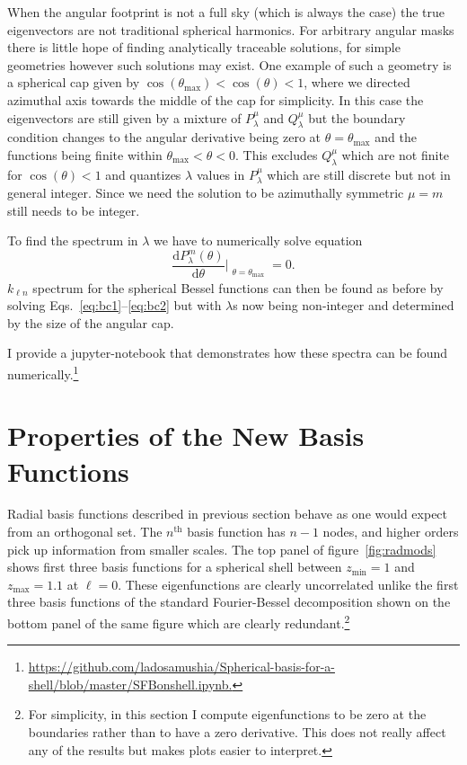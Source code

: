 \documentclass[fleqn,usenatbib]{mnras}
\begin{document}
When the angular footprint is not a full sky (which is always the case) the
true eigenvectors are not traditional spherical harmonics. For arbitrary
angular masks there is little hope of finding analytically traceable solutions,
for simple geometries however such solutions may exist. One example of such a
geometry is a spherical cap given by $\cos(\theta_\mathrm{max}) < \cos(\theta) <
1$, where we directed azimuthal axis towards the middle of the cap for
simplicity. In this case the eigenvectors are still given by a mixture of
$P^\mu_\lambda$ and $Q^\mu_\lambda$ but the boundary condition changes to the
angular derivative being zero at $\theta = \theta_\mathrm{max}$ and the
functions being finite within $\theta_\mathrm{max} < \theta < 0$. This excludes
$Q^\mu_\lambda$ which are not finite for $\cos(\theta) < 1$ and quantizes
$\lambda$ values in $P^\mu_\lambda$ which are still discrete but not in general
integer. Since we need the solution to be azimuthally symmetric $\mu = m$ still
needs to be integer. 

To find the spectrum in $\lambda$ we have to numerically solve equation
\begin{equation}
\frac{\mathrm{d}P^m_\lambda(\theta)}{\mathrm{d}\theta}\Bigr|_{\substack{\theta=\theta_\mathrm{max}}}
= 0.
\end{equation}
\noindent
$k_{\ell n}$ spectrum for the spherical Bessel functions can then be found as
before by solving Eqs.~\eqref{eq:bc1}--\eqref{eq:bc2} but with $\lambda$s now
being non-integer and determined by the size of the angular cap.

I provide a jupyter-notebook that demonstrates how these spectra can be found
numerically.\footnote{\url{https://github.com/ladosamushia/Spherical-basis-for-a-shell/blob/master/SFBonshell.ipynb.}}

\section{Properties of the New Basis Functions}
\label{sec:properties}

Radial basis functions described in previous section behave as one would expect
from an orthogonal set. The $n^\mathrm{th}$ basis function has $n - 1$ nodes,
and higher orders pick up information from smaller scales. The top panel of
figure~\ref{fig:radmods} shows first three basis functions for a spherical
shell between $z_\mathrm{min} = 1$ and $z_\mathrm{max} = 1.1$ at $\ell = 0$.
These eigenfunctions are clearly uncorrelated unlike the first three basis
functions of the standard Fourier-Bessel decomposition shown on the bottom
panel of the same figure which are clearly redundant.\footnote{For simplicity,
in this section I compute eigenfunctions to be zero at the boundaries rather
than to have a zero derivative. This does not really affect any of the results
but makes plots easier to interpret.}
\end{document}
